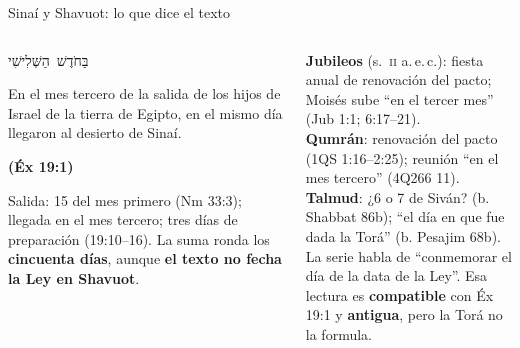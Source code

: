 \documentclass[hyperref={bookmarks=false},aspectratio=169]{beamer}
\newcommand{\heb}[1]{\mbox{\foreignlanguage{hebrew}{#1}}}
\newcommand{\fuente}[1]{\par\hfill{\upshape\bfseries\footnotesize\textcolor{tierraroja}{#1}}}
\newcommand{\destacar}[1]{\textbf{\textcolor{tierraroja}{#1}}}
\begin{document}
\begin{frame}{Sinaí y Shavuot: lo que dice el texto}
\begin{columns}[t,onlytextwidth]
\begin{column}{0.47\textwidth}
\centering\heb{בַּחֹדֶשׁ הַשְּׁלִישִׁי}\par
\begin{cita}En el mes tercero de la salida de los hijos de Israel de la tierra de Egipto, en el mismo día llegaron al desierto de Sinaí.\fuente{(Éx 19:1)}\end{cita}
\scriptsize\RaggedRight Salida: 15 del mes primero (Nm 33:3); llegada en el mes tercero; tres días de preparación (19:10--16). La suma ronda los \destacar{cincuenta días}, aunque \destacar{el texto no fecha la Ley en Shavuot}.
\end{column}
\begin{column}{0.51\textwidth}
\begin{tcolorbox}[colback=mostaza!10,colframe=mostaza!85!tierraroja,boxrule=0.6pt,arc=2pt,left=4pt,right=4pt,top=2pt,bottom=2pt,fonttitle=\bfseries\scriptsize,coltitle=caferojizo,colbacktitle=mostaza!30,title={Precisión: ¿desde cuándo es la fiesta del Sinaí?}]
\scriptsize\RaggedRight
\textbf{Jubileos} (s.~\textsc{ii} a.\,e.\,c.): fiesta anual de renovación del pacto; Moisés sube ``en el tercer mes'' (Jub 1:1; 6:17--21).\\
\textbf{Qumrán}: renovación del pacto (1QS 1:16--2:25); reunión ``en el mes tercero'' (4Q266 11).\\
\textbf{Talmud}: ¿6 o 7 de Siván? (b. Shabbat 86b); ``el día en que fue dada la Torá'' (b. Pesajim 68b).\\[2pt]
La serie habla de ``conmemorar el día de la data de la Ley''. Esa lectura es \destacar{compatible} con Éx 19:1 y \destacar{antigua}, pero la Torá no la formula.
\end{tcolorbox}
\end{column}
\end{columns}
\end{frame}
\end{document}
